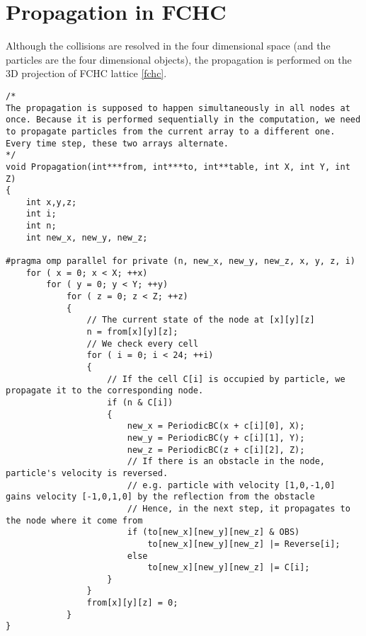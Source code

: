 \section{Propagation in FCHC}
Although the collisions are resolved in the four dimensional space (and the particles are the four dimensional objects), the propagation is performed on the 3D projection of FCHC lattice \ref{fchc}.

\begin{lstlisting}
/* 
The propagation is supposed to happen simultaneously in all nodes at once. Because it is performed sequentially in the computation, we need to propagate particles from the current array to a different one. Every time step, these two arrays alternate.
*/
void Propagation(int***from, int***to, int**table, int X, int Y, int Z)
{
	int x,y,z;
	int i;
	int n;
	int new_x, new_y, new_z;

#pragma omp parallel for private (n, new_x, new_y, new_z, x, y, z, i)
	for ( x = 0; x < X; ++x)
		for ( y = 0; y < Y; ++y)
			for ( z = 0; z < Z; ++z)
			{
				// The current state of the node at [x][y][z]				
				n = from[x][y][z];
				// We check every cell
				for ( i = 0; i < 24; ++i)
				{
					// If the cell C[i] is occupied by particle, we propagate it to the corresponding node. 
					if (n & C[i])
					{
						new_x = PeriodicBC(x + c[i][0], X);
						new_y = PeriodicBC(y + c[i][1], Y);
						new_z = PeriodicBC(z + c[i][2], Z);
						// If there is an obstacle in the node, particle's velocity is reversed.
						// e.g. particle with velocity [1,0,-1,0] gains velocity [-1,0,1,0] by the reflection from the obstacle
						// Hence, in the next step, it propagates to the node where it come from
						if (to[new_x][new_y][new_z] & OBS)
							to[new_x][new_y][new_z] |= Reverse[i];
						else
							to[new_x][new_y][new_z] |= C[i];
					}
				}
				from[x][y][z] = 0;
			}
}
\end{lstlisting}